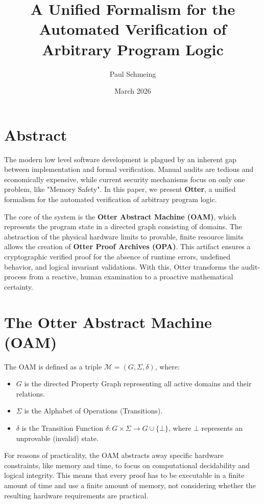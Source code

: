 \documentclass{article}
\title{A Unified Formalism for the Automated Verification of Arbitrary Program Logic}
\author{Paul Schmeing }
\date{March 2026}
\begin{document}
    \maketitle

    \section{Abstract}

    The modern low level software development is plagued by an inherent gap between implementation and formal verification. Manual audits are tedious and economically expensive, while current security mechanisms focus on only one problem, like "Memory Safety". In this paper, we present \textbf{Otter}, a unified formalism for the automated verification of arbitrary program logic.

    The core of the system is the \textbf{Otter Abstract Machine (OAM)}, which represents the program state in a directed graph consisting of domains. The abstraction of the physical hardware limits to provable, finite resource limits allows the creation of \textbf{Otter Proof Archives (OPA)}. This artifact ensures a cryptographic verified proof for the absence of runtime errors, undefined behavior, and logical invariant validations. With this, Otter transforms the audit-process from a reactive, human examination to a proactive mathematical certainty.

    \section{The Otter Abstract Machine (OAM)}

    The OAM is defined as a triple $\mathcal{M}=(G,\Sigma,\delta)$, where:

    \begin{itemize}
        \item $G$ is the directed Property Graph representing all active domains and their relations.
        \item $\Sigma$ is the Alphabet of Operations (Transitions).
        \item $\delta$ is the Transition Function $\delta : G \times \Sigma \to G \cup \{ \bot \}$, where $\bot$ represents an unprovable (invalid) state.
    \end{itemize}

    For reasons of practicality, the OAM abstracts away specific hardware constraints, like memory and time, to focus on computational decidability and logical integrity. This means that every proof has to be executable in a finite amount of time and use a finite amount of memory, not considering whether the resulting hardware requirements are practical.
\end{document}
